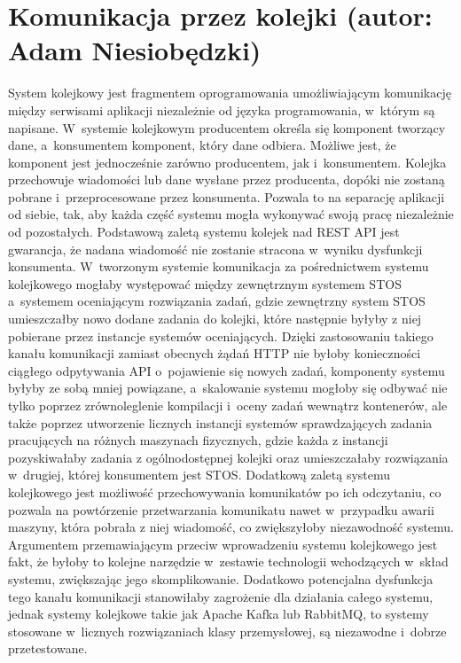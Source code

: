 \section{Komunikacja przez kolejki (autor: Adam Niesiobędzki)}
System kolejkowy jest fragmentem oprogramowania umożliwiającym komunikację między serwisami aplikacji niezależnie od języka programowania, w~którym są napisane. W~systemie kolejkowym producentem określa się komponent tworzący dane, a~konsumentem komponent, który dane odbiera. Możliwe jest, że komponent jest jednocześnie zarówno producentem, jak i~konsumentem. Kolejka przechowuje wiadomości lub dane wysłane przez producenta, dopóki nie zostaną pobrane i~przeprocesowane przez konsumenta. Pozwala to na separację aplikacji od siebie, tak, aby każda część systemu mogła wykonywać swoją pracę niezależnie od pozostałych. Podstawową zaletą systemu kolejek nad REST API jest gwarancja, że nadana wiadomość nie zostanie stracona w~wyniku dysfunkcji konsumenta. W~tworzonym systemie komunikacja za pośrednictwem systemu kolejkowego mogłaby występować między zewnętrznym systemem STOS a~systemem oceniającym rozwiązania zadań, gdzie zewnętrzny system STOS umieszczałby nowo dodane zadania do kolejki, które następnie byłyby z niej pobierane przez instancje systemów oceniających. Dzięki zastosowaniu takiego kanału komunikacji zamiast obecnych żądań HTTP nie byłoby konieczności ciągłego odpytywania API o~pojawienie się nowych zadań, komponenty systemu byłyby ze sobą mniej powiązane, a~skalowanie systemu mogłoby się odbywać nie tylko poprzez zrównoleglenie kompilacji i~oceny zadań wewnątrz kontenerów, ale także poprzez utworzenie licznych instancji systemów sprawdzających zadania pracujących na różnych maszynach fizycznych, gdzie każda z instancji pozyskiwałaby zadania z ogólnodostępnej kolejki oraz umieszczałaby rozwiązania w~drugiej, której konsumentem jest STOS. Dodatkową zaletą systemu kolejkowego jest możliwość przechowywania komunikatów po ich odczytaniu, co pozwala na powtórzenie przetwarzania komunikatu nawet w~przypadku awarii maszyny, która pobrała z niej wiadomość, co zwiększyłoby niezawodność systemu. Argumentem przemawiającym przeciw wprowadzeniu systemu kolejkowego jest fakt, że byłoby to kolejne narzędzie w~zestawie technologii wchodzących w~skład systemu, zwiększając jego skomplikowanie. Dodatkowo potencjalna dysfunkcja tego kanału komunikacji stanowiłaby zagrożenie dla działania całego systemu, jednak systemy kolejkowe takie jak Apache Kafka lub RabbitMQ, to systemy stosowane w~licznych rozwiązaniach klasy przemysłowej, są niezawodne i~dobrze przetestowane.
